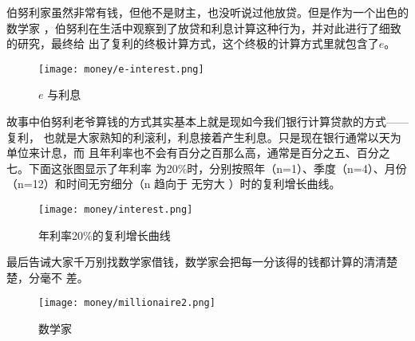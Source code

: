 伯努利家虽然非常有钱，但他不是财主，也没听说过他放贷。但是作为一个出色的数学家
，伯努利在生活中观察到了放贷和利息计算这种行为，并对此进行了细致的研究，最终给
出了复利的终极计算方式，这个终极的计算方式里就包含了$e$。

\begin{figure}[htbp]
\centering
\texttt{[image: money/e-interest.png]}
\caption{$ e$ 与利息}
\centering
\end{figure}

故事中伯努利老爷算钱的方式其实基本上就是现如今我们银行计算贷款的方式——复利，
也就是大家熟知的利滚利，利息接着产生利息。只是现在银行通常以天为单位来计息，而
且年利率也不会有百分之百那么高，通常是百分之五、百分之七。下面这张图显示了年利率
为20\%时，分别按照年（n=1）、季度（n=4）、月份（n=12）和时间无穷细分（n 趋向于
无穷大 ）时的复利增长曲线。

\begin{figure}[htbp]
\centering
\texttt{[image: money/interest.png]}
\caption{年利率20\%的复利增长曲线}
\centering
\end{figure}


最后告诫大家千万别找数学家借钱，数学家会把每一分该得的钱都计算的清清楚楚，分毫不
差。

\begin{figure}[htbp]
\centering
\texttt{[image: money/millionaire2.png]}
\caption{数学家}
\centering
\end{figure}


